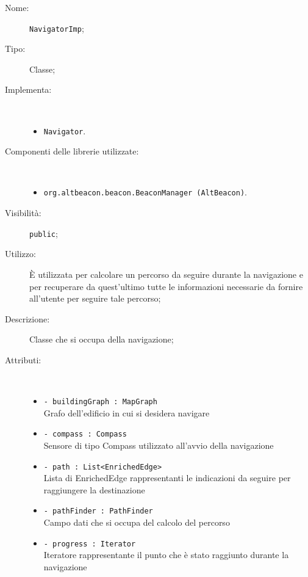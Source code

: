 \documentclass[../DefinizioneDiProdotto.tex]{subfiles}
\begin{document}
    \begin{description}
\item[Nome:] \texttt{NavigatorImp};
\item[Tipo:] Classe;
\item[Implementa:] \
\begin{itemize}
\item \texttt{Navigator}.

\end{itemize}
\item[Componenti delle librerie utilizzate:] \
\begin{itemize}
\item \texttt{org.altbeacon.beacon.BeaconManager (AltBeacon)}.

\end{itemize}
\item[Visibilità:] \texttt{public};
\item[Utilizzo:] È utilizzata per calcolare un percorso da seguire durante la navigazione e per recuperare da quest'ultimo tutte le informazioni necessarie da fornire all'utente per seguire tale percorso;
\item[Descrizione:] Classe che si occupa della navigazione;
\item[Attributi:] \
\begin{itemize}
\item \texttt{- buildingGraph : MapGraph}\\
Grafo dell'edificio in cui si desidera navigare

\item \texttt{- compass : Compass}\\
Sensore di tipo Compass utilizzato all'avvio della navigazione

\item \texttt{- path : List<EnrichedEdge>}\\
Lista di EnrichedEdge rappresentanti le indicazioni da seguire per raggiungere la destinazione

\item \texttt{- pathFinder : PathFinder}\\
Campo dati che si occupa del calcolo del percorso

\item \texttt{- progress : Iterator}\\
Iteratore rappresentante il punto che è stato raggiunto durante la navigazione


\end{itemize}
\end{description}
\end{document}

